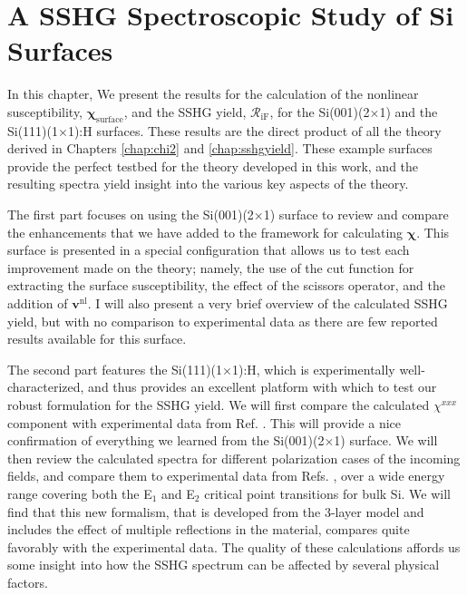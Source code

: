 \chapter{A SSHG Spectroscopic Study of Si Surfaces}\label{chap:results}
\partialtoc

In this chapter, We present the results for the calculation of the nonlinear
susceptibility, $\boldsymbol{\chi}_{\mathrm{surface}}$, and the SSHG yield,
$\mathcal{R}_{\mathrm{iF}}$, for the Si(001)(2$\times$1) and the
Si(111)(1$\times$1):H surfaces. These results are the direct product of all the
theory derived in Chapters \ref{chap:chi2} and \ref{chap:sshgyield}. These
example surfaces provide the perfect testbed for the theory developed in this
work, and the resulting spectra yield insight into the various key aspects of
the theory.

The first part focuses on using the Si(001)(2$\times$1) surface to review and
compare the enhancements that we have added to the framework for calculating
$\boldsymbol{\chi}$. This surface is presented in a special configuration that
allows us to test each improvement made on the theory; namely, the use of the
cut function for extracting the surface susceptibility, the effect of the
scissors operator, and the addition of $\mathbf{v}^{\mathrm{nl}}$. I will also
present a very brief overview of the calculated SSHG yield, but with no
comparison to experimental data as there are few reported results available for
this surface.

The second part features the Si(111)(1$\times$1):H, which is experimentally
well-characterized, and thus provides an excellent platform with which to test
our robust formulation for the SSHG yield. We will first compare the calculated
$\chi^{xxx}$ component with experimental data from Ref. \cite{hoferAPA96}. This
will provide a nice confirmation of everything we learned from the
Si(001)(2$\times$1) surface. We will then review the calculated spectra for
different polarization cases of the incoming fields, and compare them to
experimental data from Refs. \cite{bergfeldPRL04, mejiaPRB02, mitchellSS01},
over a wide energy range covering both the E$_{1}$ and E$_{2}$ critical point
transitions for bulk Si. We will find that this new formalism, that is developed
from the 3-layer model and includes the effect of multiple reflections in the
material, compares quite favorably with the experimental data. The quality of
these calculations affords us some insight into how the SSHG spectrum can be
affected by several physical factors.


